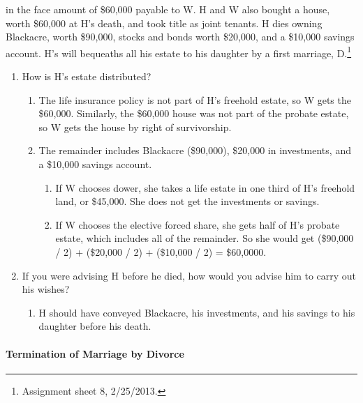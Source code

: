 \begin{enumerate}
    in the face amount of \$60,000 payable to W. H and W also bought a house, 
    worth \$60,000 at H's death, and took title as joint tenants. H dies 
    owning Blackacre, worth \$90,000, stocks and bonds worth \$20,000, and a 
    \$10,000 savings account. H's will bequeaths all his estate to his 
    daughter by a first marriage, D.\footnote{Assignment sheet 8, 2/25/2013.}
    \begin{enumerate}
        \item How is H's estate distributed?
        \begin{enumerate}
            \item The life insurance policy is not part of H's freehold 
            estate, so W gets the \$60,000. Similarly, the \$60,000 house was 
            not part of the probate estate, so W gets the house by right of 
            survivorship.
            \item The remainder includes Blackacre (\$90,000), \$20,000 in  
            investments, and a \$10,000 savings account.
            \begin{enumerate}
                \item If W chooses dower, she takes a life estate in one third 
                of H's freehold land, or \$45,000. She does not get the 
                investments or savings.
                \item If W chooses the elective forced share, she gets half of 
                H's probate estate, which includes all of the remainder. So 
                she would get (\$90,000 / 2) + (\$20,000 / 2) + (\$10,000 / 2) 
                = \$60,0000.
            \end{enumerate}
        \end{enumerate}
        \item If you were advising H before he died, how would you advise him 
        to carry out his wishes?
        \begin{enumerate}
            \item H should have conveyed Blackacre, his investments, and his 
            savings to his daughter before his death.
        \end{enumerate}
    \end{enumerate}
\end{enumerate}

\paragraph{Termination of Marriage by Divorce}

